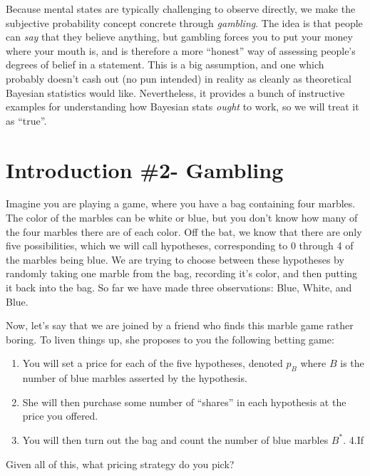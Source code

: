 \documentclass[
]{article}
\providecommand{\tightlist}{%
  \setlength{\itemsep}{0pt}\setlength{\parskip}{0pt}}
\begin{document}
Because mental states are typically challenging to observe directly, we
make the subjective probability concept concrete through
\emph{gambling}. The idea is that people can \emph{say} that they
believe anything, but gambling forces you to put your money where your
mouth is, and is therefore a more ``honest'' way of assessing people's
degrees of belief in a statement. This is a big assumption, and one
which probably doesn't cash out (no pun intended) in reality as cleanly
as theoretical Bayesian statistics would like. Nevertheless, it provides
a bunch of instructive examples for understanding how Bayesian stats
\emph{ought} to work, so we will treat it as ``true''.

\hypertarget{introduction-2--gambling}{%
\section{Introduction \#2- Gambling}\label{introduction-2--gambling}}

Imagine you are playing a game, where you have a bag containing four
marbles. The color of the marbles can be white or blue, but you don't
know how many of the four marbles there are of each color. Off the bat,
we know that there are only five possibilities, which we will call
hypotheses, corresponding to 0 through 4 of the marbles being blue. We
are trying to choose between these hypotheses by randomly taking one
marble from the bag, recording it's color, and then putting it back into
the bag. So far we have made three observations: Blue, White, and Blue.

Now, let's say that we are joined by a friend who finds this marble game
rather boring. To liven things up, she proposes to you the following
betting game:

\begin{enumerate}
\def\labelenumi{\arabic{enumi}.}
\tightlist
\item
  You will set a price for each of the five hypotheses, denoted \(p_B\)
  where \(B\) is the number of blue marbles asserted by the hypothesis.
\item
  She will then purchase some number of ``shares'' in each hypothesis at
  the price you offered.\\
\item
  You will then turn out the bag and count the number of blue marbles
  \(B^*\). 4.If
\end{enumerate}

Given all of this, what pricing strategy do you pick?
\end{document}
